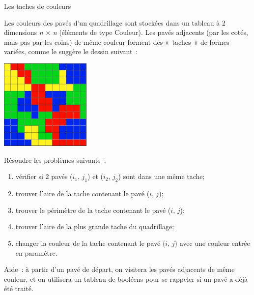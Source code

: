 	\begin{Exercice}{Les taches de couleurs}

		Les couleurs des pavés d'un quadrillage sont stockées dans un tableau 
		à 2 dimensions \textit{n} ${\times}$ \textit{n} (éléments de type Couleur). 
		Les pavés adjacents (par les cotés, mais pas par les coins) de même 
		couleur forment des «~taches~» de formes variées, comme le suggère 
		le dessin suivant~:
		\begin{center}
		\includegraphics[width=4.452cm,height=4.452cm]{image/a2012Logique2eme-img026.jpg}
		\end{center}
		
		Résoudre les problèmes suivants~:

		\begin{enumerate}
			\item {
				vérifier si 2 pavés ($i_1$, $j_1$) et ($i_2$, $j_2$) 
				sont dans une même tache;}
			\item {
				trouver l'aire de la tache contenant le pavé ($i$, $j$);}
			\item {
				trouver le périmètre de la tache contenant le pavé ($i$, $j$);}
			\item {
				trouver l'aire de la plus grande tache du quadrillage;}
			\item {
				changer la couleur de la tache contenant le pavé ($i$, $j$) 
				avec une couleur entrée en paramètre.}
		\end{enumerate}
		
		Aide~: à partir d'un pavé de départ, on visitera les pavés 
		adjacents de même couleur, et on utilisera un tableau de
		booléens pour se rappeler si un pavé a déjà été traité.
	\end{Exercice}
	
